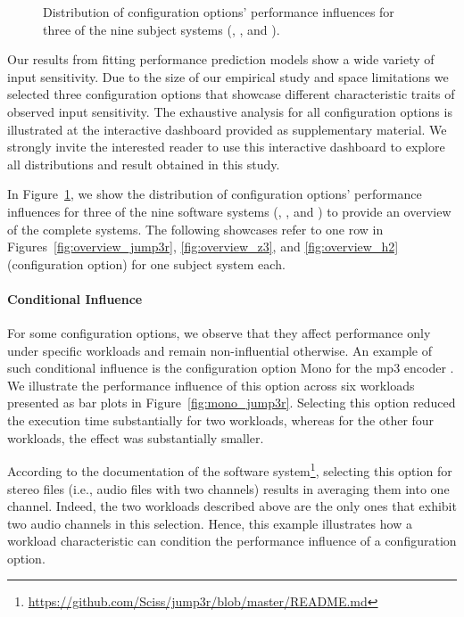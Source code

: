{{{\begin{figure}
	\caption{\color{blue} Distribution of configuration options' performance influences for three of the nine subject systems (\jumper, \zdrei, and \htwo).}
	\label{fig:three_systems}
\end{figure}
	
Our results from fitting performance prediction models show a wide variety of input sensitivity. Due to the size of our empirical study and space limitations we selected three configuration options that showcase different characteristic traits of observed input sensitivity. The exhaustive analysis for all configuration options is illustrated at the interactive dashboard provided as supplementary material. We strongly invite the interested reader to use this interactive dashboard to explore all distributions and result obtained in this study.

{\color{blue} In Figure~\ref{fig:three_systems}, we show the distribution of configuration options' performance influences for three of the nine software systems (\jumper, \zdrei, and \htwo) to provide an overview of the complete systems. The following showcases refer to one row in Figures~\ref{fig:overview_jump3r}, \ref{fig:overview_z3}, and \ref{fig:overview_h2} (configuration option) for one subject system each.}

\paragraph{Conditional Influence}\label{sec:conditional_influence} For some configuration options, we observe that they affect performance only under specific workloads and remain non-influential otherwise. An example of such conditional influence is the configuration option \textsf{Mono} for the mp3 encoder \jumper. We illustrate the performance influence of this option across six workloads presented as bar plots in Figure~\ref{fig:mono_jump3r}. Selecting this option reduced the execution time substantially for two workloads, whereas for the other four workloads, the effect was substantially smaller.

According to the documentation of the software system\footnote{\url{https://github.com/Sciss/jump3r/blob/master/README.md}}, selecting this option for stereo files (i.e., audio files with two channels) results in averaging them into one channel. Indeed, the two workloads described above are the only ones that exhibit two audio channels in this selection. Hence, this example illustrates how a workload  characteristic can condition the performance influence of a configuration option. 

}}}
